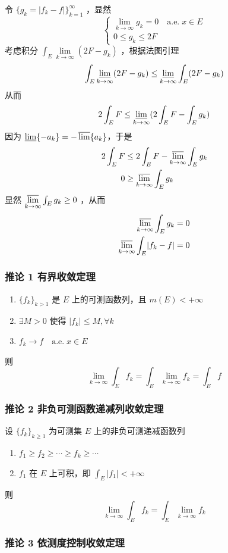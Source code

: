 \documentclass{ctexbook}
\newcommand{\nae}{\mathrm{\quad a.e.\; }}
\newcommand{\ITEMS}{\begin{enumerate}[leftmargin=4em]}
\newcommand{\ITEME}{\end{enumerate}}
\begin{document}
令 $\{ g_k = \lvert f_k - f \rvert \}_{k=1}^\infty$ ，显然
\[
	\begin{cases}
		\lim\limits_{k\to\infty} g_k = 0  \nae x\in E\\
		0\le g_k \le 2F
	\end{cases}
\]
考虑积分 $\int_E \lim\limits_{k\to\infty} (2F - g_k)$ ，根据法图引理
\[
	\int_E \varliminf\limits_{k\to\infty} (2F - g_k) \le \varliminf\limits_{k\to\infty} \int_E  (2F - g_k)
\]
从而
\[
	2\int_E F \le \varliminf_{k\to\infty} (2\int_E F  - \int_E g_k)
\]
因为 $\varliminf\{-a_k\} = - \varlimsup\{a_k\}$，于是
\[
\begin{aligned}
	2\int_E F &\le 2\int_E F - \varlimsup_{k\to\infty} \int_E g_k \\
	0 &\ge \varlimsup_{k\to\infty} \int_E g_k
\end{aligned}
\]
显然 $\varlimsup\limits_{k\to\infty}\int_E g_k \ge 0$ ，从而
\[
	\begin{aligned}
		\varlimsup\limits_{k\to\infty}\int_E g_k = 0\\
		\varlimsup\limits_{k\to\infty}\int_E \lvert f_k - f \rvert = 0
	\end{aligned}
\]

\subsubsection{推论 1  有界收敛定理}
\ITEMS
	\item $\{f_k\}_{k>1}$ 是 $E$ 上的可测函数列，且 $m(E) < +\infty$
	\item $\exists M > 0$ 使得 $\lvert f_k \rvert \le M , \forall k$
	\item $f_k \to f \nae x\in E$
\ITEME 
则
\[
	\lim_{k\to\infty} \int_E f_k =\int_E \lim_{k\to\infty} f_k = \int_E f
\]

\subsubsection{推论 2 非负可测函数递减列收敛定理}

设 $\{f_k\}_{k\ge 1}$ 为可测集 $E$ 上的非负可测递减函数列
\ITEMS
	\item $f_1 \ge f_2 \ge \cdots \ge f_k \ge \cdots$
	\item $f_1$ 在 $E$ 上可积，即 $\int_E \lvert f_1\rvert  < +\infty$ 
\ITEME 
则
\[
	\lim_{k\to\infty}\int_E f_k  = \int_E \lim_{k\to\infty} f_k 
\]

\subsubsection{推论 3  依测度控制收敛定理}
\end{document}
